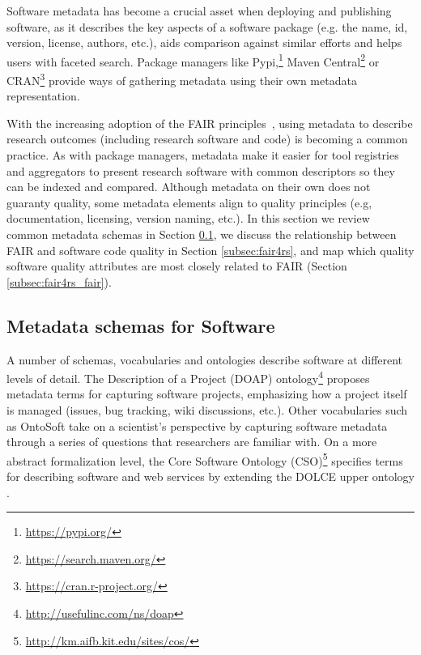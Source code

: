 
Software metadata has become a crucial asset when deploying and publishing software, as it describes the key aspects of a software package (e.g. the name, id, version, license, authors, etc.), aids comparison against similar efforts and helps users with faceted search. Package managers like Pypi,\footnote{\url{https://pypi.org/}} Maven Central\footnote{\url{https://search.maven.org/}} or CRAN\footnote{\url{https://cran.r-project.org/}} provide ways of gathering metadata using their own metadata representation.

With the increasing adoption of the FAIR principles~\cite{wilkinson_fair_2016}, using metadata to describe research outcomes (including research software and code) is becoming a common practice. As with package managers, metadata make it easier for tool registries and aggregators to present research software with common descriptors so they can be indexed and compared. Although metadata on their own does not guaranty quality, some metadata elements align to quality principles (e.g, documentation, licensing, version naming, etc.). In this section we review common metadata schemas in Section \ref{subsec:schemas}, we discuss the relationship between FAIR and software code quality in Section \ref{subsec:fair4rs}, and map which quality software quality attributes are most closely related to FAIR (Section \ref{subsec:fair4rs_fair}).

\subsection{Metadata schemas for Software}
\label{subsec:schemas}

A number of schemas, vocabularies and ontologies describe software at different levels of detail. The Description of a Project (DOAP) ontology\footnote{\url{http://usefulinc.com/ns/doap}} proposes metadata terms for capturing software projects, emphasizing how a project itself is managed (issues, bug tracking, wiki discussions, etc.). Other vocabularies such as OntoSoft \cite{gil2016ontosoft} take on a scientist's perspective by capturing software metadata through a series of questions that researchers are familiar with. On a more abstract formalization level, the Core Software Ontology (CSO)\footnote{\url{http://km.aifb.kit.edu/sites/cos/}} specifies terms for describing software and web services by extending the DOLCE upper ontology \cite{gangemi2002sweetening}.

